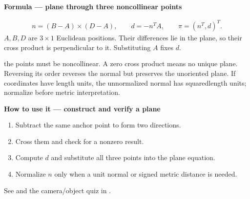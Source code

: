 \documentclass[letterpaper,11pt,english,openany,oneside]{jupyterBook}
\begin{document}
\begin{TextbookBox}
\textbf{Formula — plane through three noncollinear points}\par\smallskip
\begin{equation}\label{equation:lectures/lecture01/planes-lines:eq-lec01-plane-points}
\begin{split}n=(B-A)\times(D-A),\qquad d=-n^TA,\qquad \pi=(n^T,d)^T.\end{split}
\end{equation}
\sphinxAtStartPar
\(A,B,D\) are \(3\times1\) Euclidean positions. Their differences lie in the plane, so their cross product is perpendicular to it. Substituting \(A\) fixes \(d\).

\sphinxAtStartPar
{} the points must be noncollinear. A zero cross product means no unique plane. Reversing its order reverses the normal but preserves the unoriented plane. If coordinates have length units, the unnormalized normal has squared\sphinxhyphen{}length units; normalize before metric interpretation.

\end{TextbookBox}

\begin{TextbookBox}
\textbf{How to use it — construct and verify a plane}\par\smallskip
\begin{enumerate}
%
\item {}
\sphinxAtStartPar
Subtract the same anchor point to form two directions.

\item {}
\sphinxAtStartPar
Cross them and check for a nonzero result.

\item {}
\sphinxAtStartPar
Compute \(d\) and substitute all three points into the plane equation.

\item {}
\sphinxAtStartPar
Normalize \(n\) only when a unit normal or signed metric distance is needed.

\end{enumerate}

\sphinxAtStartPar
See {\hyperref[\detokenize{lectures/lecture01/planes-lines:ex-lec01-plane}]{}} and the camera/object quiz in {\hyperref[\detokenize{lectures/lecture01/frames-quizzes:lec01-frames}]{}}.

\end{TextbookBox}
\end{document}
